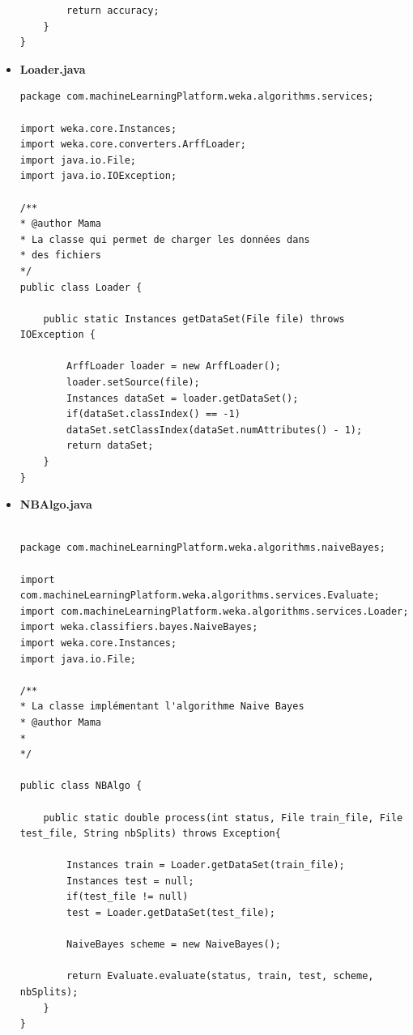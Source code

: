 \documentclass[a4paper,11pt]{article}
\begin{document}
\begin{itemize}
\begin{verbatim}
        return accuracy;
    }
}

\end{verbatim}

\item \textbf{Loader.java}
\begin{verbatim}
package com.machineLearningPlatform.weka.algorithms.services;

import weka.core.Instances;
import weka.core.converters.ArffLoader;
import java.io.File;
import java.io.IOException;

/**
* @author Mama
* La classe qui permet de charger les données dans
* des fichiers
*/
public class Loader {

    public static Instances getDataSet(File file) throws IOException {

        ArffLoader loader = new ArffLoader();
        loader.setSource(file);
        Instances dataSet = loader.getDataSet();
        if(dataSet.classIndex() == -1)
        dataSet.setClassIndex(dataSet.numAttributes() - 1);
        return dataSet;
    }
}

\end{verbatim}

\item \textbf{NBAlgo.java}
\begin{verbatim}

package com.machineLearningPlatform.weka.algorithms.naiveBayes;

import com.machineLearningPlatform.weka.algorithms.services.Evaluate;
import com.machineLearningPlatform.weka.algorithms.services.Loader;
import weka.classifiers.bayes.NaiveBayes;
import weka.core.Instances;
import java.io.File;

/**
* La classe implémentant l'algorithme Naive Bayes
* @author Mama
*
*/

public class NBAlgo {

    public static double process(int status, File train_file, File test_file, String nbSplits) throws Exception{

        Instances train = Loader.getDataSet(train_file);
        Instances test = null;
        if(test_file != null)
        test = Loader.getDataSet(test_file);

        NaiveBayes scheme = new NaiveBayes();

        return Evaluate.evaluate(status, train, test, scheme, nbSplits);
    }
}
\end{verbatim}


\end{itemize}
\end{document}
